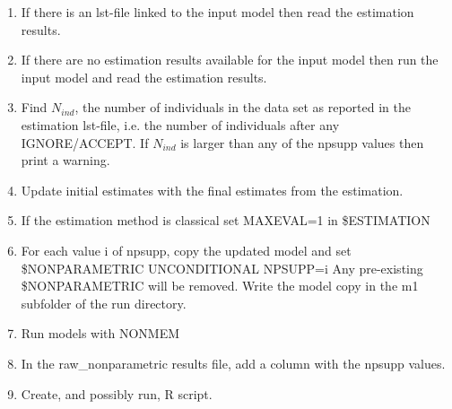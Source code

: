 \begin{enumerate}
\item If there is an lst-file linked to the input model then read the estimation results. %
\item If there are no estimation results available for the input model then run the input model and read the estimation results.

\item Find $N_{ind}$, the number of individuals in the data set as reported in the estimation lst-file,
i.e. the number of individuals after any IGNORE/ACCEPT. If $N_{ind}$ is larger than any of the npsupp values
then print a warning.
\item Update initial estimates with the final estimates from the estimation.
\item If the estimation method is classical set MAXEVAL=1 in \$ESTIMATION 
\item For each value i of npsupp, copy the updated model and set \$NONPARAMETRIC UNCONDITIONAL NPSUPP=i
Any pre-existing \$NONPARAMETRIC will be removed.
Write the model copy in the m1 subfolder of the run directory.
\item Run models with NONMEM
\item In the raw\_nonparametric results file, add a column with the npsupp values. 
\item Create, and possibly run, R script. %
\end{enumerate}



